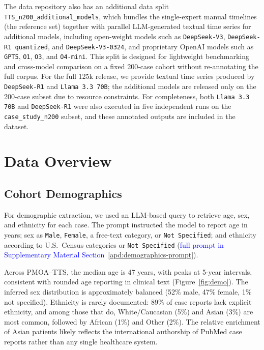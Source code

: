 \documentclass[pdflatex,sn-mathphys-num]{sn-jnl}%
\theoremstyle{thmstyleone}%
\theoremstyle{thmstyletwo}%
\theoremstyle{thmstylethree}%
\begin{document}
The data repository also has an additional data split \texttt{TTS\_n200\_additional\_models}, which bundles the single-expert manual timelines (the reference set) together with parallel LLM-generated textual time series for additional models, including open-weight models such as \texttt{DeepSeek-V3}, \texttt{DeepSeek-R1 quantized}, and \texttt{DeepSeek-V3-0324}, and proprietary OpenAI models such as \texttt{GPT5}, \texttt{O1}, \texttt{O3}, and \texttt{O4-mini}. This split is designed for lightweight benchmarking and cross-model comparison on a fixed 200-case cohort without re-annotating the full corpus. For the full 125k release, we provide textual time series produced by \texttt{DeepSeek-R1} and \texttt{Llama 3.3 70B}; the additional models are released only on the 200-case subset due to resource constraints. For completeness, both \texttt{Llama 3.3 70B} and \texttt{DeepSeek-R1} were also executed in five independent runs on the \texttt{case\_study\_n200} subset, and these annotated outputs are included in the dataset.



\section{Data Overview}
\label{sec:data-overview}

\subsection{Cohort Demographics}
\label{sec:cohort-demographics}

For demographic extraction, we used an LLM-based query to retrieve age, sex, and ethnicity for each case. 
The prompt instructed the model to report age in years; sex as \texttt{Male}, \texttt{Female}, a free-text category, or \texttt{Not Specified}; and ethnicity according to U.S.\ Census categories or \texttt{Not Specified} (\textcolor{blue}{full prompt in Supplementary Material Section~\ref{apd:demographics-prompt}}).

Across PMOA--TTS, the median age is 47 years, with peaks at 5-year intervals, consistent with rounded age reporting in clinical text (Figure~\ref{fig:demo}). 
The inferred sex distribution is approximately balanced (52\% male, 47\% female, 1\% not specified). 
Ethnicity is rarely documented: 89\% of case reports lack explicit ethnicity, and among those that do, White/Caucasian (5\%) and Asian (3\%) are most common, followed by African (1\%) and Other (2\%). 
The relative enrichment of Asian patients likely reflects the international authorship of PubMed case reports rather than any single healthcare system.
\end{document}
